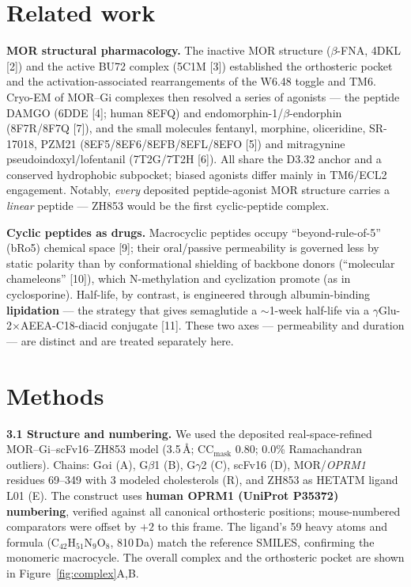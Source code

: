 \documentclass[11pt]{article}
\newcommand{\Ang}{\AA}
\newcommand{\bt}{$\beta$}
\newcommand{\al}{$\alpha$}
\newcommand{\gm}{$\gamma$}
\newcommand{\x}{$\times$}
\newcommand{\ca}{$\sim$}
\begin{document}
\section{Related work}

\textbf{MOR structural pharmacology.} The inactive MOR structure (\bt-FNA, 4DKL [2]) and the active
BU72 complex (5C1M [3]) established the orthosteric pocket and the activation-associated rearrangements
of the W6.48 toggle and TM6. Cryo-EM of MOR--Gi complexes then resolved a series of agonists --- the
peptide DAMGO (6DDE [4]; human 8EFQ) and endomorphin-1/\bt-endorphin (8F7R/8F7Q [7]), and the small
molecules fentanyl, morphine, oliceridine, SR-17018, PZM21 (8EF5/8EF6/8EFB/8EFL/8EFO [5]) and
mitragynine pseudoindoxyl/lofentanil (7T2G/7T2H [6]). All share the D3.32 anchor and a conserved
hydrophobic subpocket; biased agonists differ mainly in TM6/ECL2 engagement. Notably, \emph{every}
deposited peptide-agonist MOR structure carries a \emph{linear} peptide --- ZH853 would be the first
cyclic-peptide complex.

\textbf{Cyclic peptides as drugs.} Macrocyclic peptides occupy ``beyond-rule-of-5'' (bRo5) chemical
space [9]; their oral/passive permeability is governed less by static polarity than by conformational
shielding of backbone donors (``molecular chameleons'' [10]), which N-methylation and cyclization
promote (as in cyclosporine). Half-life, by contrast, is engineered through albumin-binding
\textbf{lipidation} --- the strategy that gives semaglutide a \ca1-week half-life via a
\gm Glu-2\x AEEA-C18-diacid conjugate [11]. These two axes --- permeability and duration --- are
distinct and are treated separately here.

\section{Methods}

\textbf{3.1 Structure and numbering.} We used the deposited real-space-refined MOR--Gi--scFv16--ZH853
model (3.5\,\Ang; CC$_{\text{mask}}$ 0.80; 0.0\% Ramachandran outliers). Chains: G\al i (A), G\bt 1
(B), G\gm 2 (C), scFv16 (D), MOR/\emph{OPRM1} residues 69--349 with 3 modeled cholesterols (R), and
ZH853 as HETATM ligand L01 (E). The construct uses \textbf{human OPRM1 (UniProt P35372) numbering},
verified against all canonical orthosteric positions; mouse-numbered comparators were offset by $+2$
to this frame. The ligand's 59 heavy atoms and formula (C$_{42}$H$_{51}$N$_9$O$_8$, 810\,Da) match the
reference SMILES, confirming the monomeric macrocycle. The overall complex and the orthosteric pocket
are shown in Figure~\ref{fig:complex}A,B.
\end{document}
